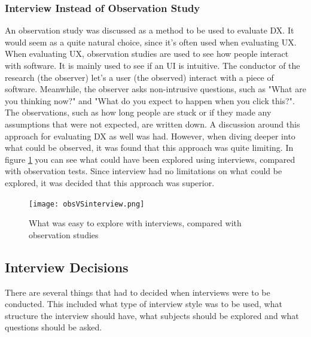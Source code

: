 \documentclass{cslthse-msc}
\begin{document}
    \subsubsection{Interview Instead of Observation Study}
    An observation study was discussed as a method to be used to evaluate DX. It would seem as a quite natural choice, since it's often used when evaluating UX. When evaluating UX, observation studies are used to see how people interact with software. It is mainly used to see if an UI is intuitive. The conductor of the research (the observer) let's a user (the observed) interact with a piece of software. Meanwhile, the observer asks non-intrusive questions, such as "What are you thinking now?" and "What do you expect to happen when you click this?". The observations, such as how long people are stuck or if they made any assumptions that were not expected, are written down. A discussion around this approach for evaluating DX as well was had. However, when diving deeper into what could be observed, it was found that this approach was quite limiting. In figure \ref{fig:obsVSinter} you can see what could have been explored using interviews, compared with observation tests. Since interview had no limitations on what could be explored, it was decided that this approach was superior.
    \begin{figure}[H]
        \centering
        \texttt{[image: obsVSinterview.png]}
        \caption{What was easy to explore with interviews, compared with observation studies}
        \label{fig:obsVSinter}
    \end{figure}
    \subsection{Interview Decisions}
    There are several things that had to decided when interviews were to be conducted. This included what type of interview style was to be used, what structure the interview should have, what subjects should be explored and what questions should be asked.
\end{document}
